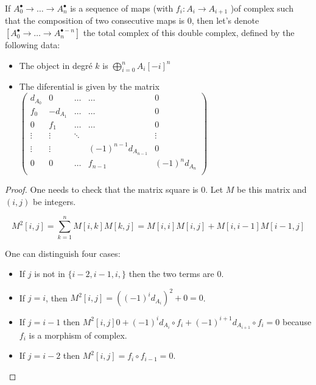 %

\begin{definition}\label{def:total_complex}
    If $A_0^{\bullet}\to\ldots \to A_n^{\bullet}$ is a sequence of maps (with $f_i:A_i\to A_{i+1}$ )of complex such that the composition of two consecutive maps is $0$, then let's denote $[A_0^{\bullet}\to\ldots \to A_n^{\bullet-n}]$ the total complex of this double complex, defined by the following data:\begin{itemize}
        \item The object in degré $k$ is $\bigoplus\limits_{i=0}^nA_i[-i]^n$
        \item The diferential is given by the matrix $\begin{pmatrix}
            d_{A_0} & 0 & \ldots & \ldots & 0\\
            f_0 & -d_{A_1} & \ldots & \ldots & 0\\
            0 & f_1 & \ldots & \ldots & 0\\
            \vdots & \vdots & \ddots &  & \vdots\\
            \vdots & \vdots & & (-1)^{n-1}d_{A_{n-1}} & 0\\
            0 & 0 & \ldots & f_{n-1} & (-1)^nd_{A_n}\\
            \end{pmatrix}$
    \end{itemize}
\end{definition}

\begin{proof}
    One needs to check that the matrix square is $0$. Let $M$ be this matrix and $(i,j)$ be integers.

    \[M^2[i,j]=\sum\limits_{k=1}^nM[i,k]M[k,j]= M[i,i] M[i,j]+M[i,i-1]M[i-1,j]\]

    One can distinguish four cases:\begin{itemize}

        \item If $j$ is not in $\{i-2,i-1,i,\}$ then the two terms are $0$. 
        \item If $j=i$, then $M^2[i,j]=((-1)^id_{A_i})^2+0=0$. 
        \item If $j=i-1$ then $M^2[i,j]0+(-1)^id_{A_i}\circ f_i+ (-1)^{i+1}d_{A_{i+1}}\circ f_i=0$ because $f_i$ is a morphism of complex.
        \item If $j=i-2$ then $M^2[i,j]=f_{i}\circ f_{i-1}=0$.
    \end{itemize}
\end{proof}

